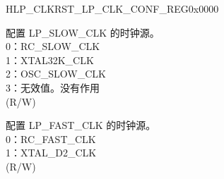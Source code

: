\begin{register}{H}{LP\_CLKRST\_LP\_CLK\_CONF\_REG}{0x0000}\label{regdesc:LPCLKRSTLPCLKCONFREG}
%
%
%
\regnewline%
\begin{regdesc}\begin{reglist}
\label{fielddesc:LPCLKRSTSLOWCLKSEL}\item [LP\_CLKRST\_SLOW\_CLK\_SEL] 配置 LP\_SLOW\_CLK 的时钟源。\\
0：RC\_SLOW\_CLK \\
1：XTAL32K\_CLK \\
2：OSC\_SLOW\_CLK  \\
3：无效值。没有作用 \\
 (R/W)
\label{fielddesc:LPCLKRSTFASTCLKSEL}\item [LP\_CLKRST\_FAST\_CLK\_SEL] 配置 LP\_FAST\_CLK 的时钟源。\\
0：RC\_FAST\_CLK \\
1：XTAL\_D2\_CLK  \\ (R/W)
\end{reglist}\end{regdesc}
\end{register}


